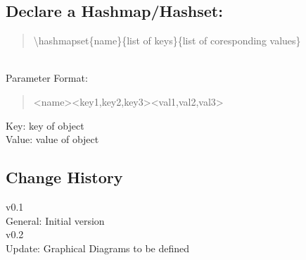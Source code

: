 \documentclass[10pt,a4paper,english]{article}
\begin{document}
\begin{flushleft}
\subsection*{Declare a Hashmap/Hashset:}
\begin{quote}{\ttfamily \raggedright \noindent
{\textbackslash}hashmapset{\{}name{\}}{\{}list of keys{\}}{\{}list of coresponding values{\}}
}\end{quote}
~\\ \medskip
Parameter Format:~\\ \medskip
\begin{quote}{\ttfamily \raggedright \noindent
<name><key1,key2,key3><val1,val2,val3>
}\end{quote}
Key:  key of object ~\\
Value: value of object ~\\

\end{flushleft}

\newpage
\begin{multicols}{2} %

\section*{Change History}
v0.1\\
\indent General: Initial version  \\ 
v0.2\\
\indent Update: Graphical Diagrams to be defined 
\end{multicols}
\end{document}
